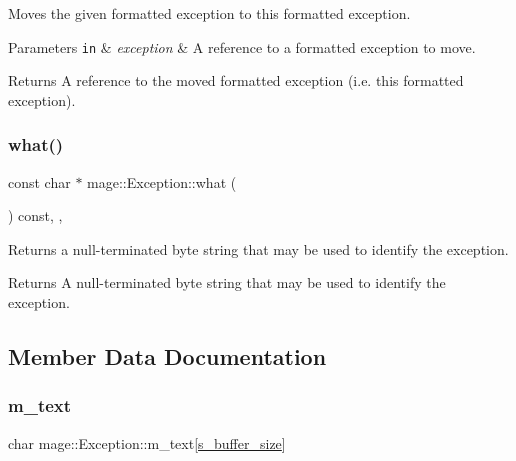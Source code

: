 Moves the given formatted exception to this formatted exception.


\begin{DoxyParams}[1]{Parameters}
\mbox{\tt in}  & {\em exception} & A reference to a formatted exception to move. \\
\hline
\end{DoxyParams}
\begin{DoxyReturn}{Returns}
A reference to the moved formatted exception (i.\+e. this formatted exception). 
\end{DoxyReturn}
\mbox{\label{classmage_1_1_exception_ae2bd4437e2b7c960f022f7d3bf79baa7}} 
\subsubsection{\texorpdfstring{what()}{what()}}
{\footnotesize\ttfamily const char $\ast$ mage\+::\+Exception\+::what (\begin{DoxyParamCaption}{ }\end{DoxyParamCaption}) const\hspace{0.3cm}{\ttfamily [override]}, {\ttfamily [virtual]}, {\ttfamily [noexcept]}}

Returns a null-\/terminated byte string that may be used to identify the exception.

\begin{DoxyReturn}{Returns}
A null-\/terminated byte string that may be used to identify the exception. 
\end{DoxyReturn}


\subsection{Member Data Documentation}
\mbox{\label{classmage_1_1_exception_ad5bd9bb044bebaa1bac36c8c8a25c052}} 
\subsubsection{\texorpdfstring{m\+\_\+text}{m\_text}}
{\footnotesize\ttfamily char mage\+::\+Exception\+::m\+\_\+text\mbox{[}\mbox{\hyperlink{classmage_1_1_exception_a74a7e3f67eac7dacf8a1a359c730534e}{s\+\_\+buffer\+\_\+size}}\mbox{]}\hspace{0.3cm}{\ttfamily [private]}}


